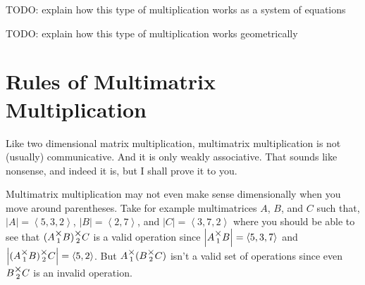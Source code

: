 \documentclass[12pt]{book}
\theoremstyle{plain}
\theoremstyle{definition}
\theoremstyle{ppart}
\theoremstyle{case}
\theoremstyle{solution}
\newcommand{\mmult}[1]{\text{\raisebox{1ex}{$\underset{#1}{\times}$}}}
\newcommand{\shape}[1]{\left|#1\right|}
\begin{document}
TODO: explain how this type of multiplication works as a system of equations

TODO: explain how this type of multiplication works geometrically

\section{Rules of Multimatrix Multiplication}

Like two dimensional matrix multiplication, multimatrix multiplication is
not (usually) communicative. And it is only weakly associative. That sounds like
nonsense, and indeed it is, but I shall prove it to you.

Multimatrix multiplication may not even make sense dimensionally when you move
around parentheses. Take for example multimatrices $A$, $B$, and $C$ such that,
$\shape{A} = \left<5,3,2\right>$,
$\shape{B} = \left<2,7\right>$, and
$\shape{C} = \left<3,7,2\right>$ where you should be able to see that
$(A \mmult{1} B) \mmult{2} C$ is a valid operation since
$\shape{A \mmult{1} B} = \left<5,3,7\right>$ and
$\shape{(A \mmult{1} B) \mmult{2} C} = \left<5,2\right>$. But
$A \mmult{1} (B \mmult{2} C)$ isn't a valid set of operations since even
$B \mmult{2} C$ is an invalid operation.
\end{document}
